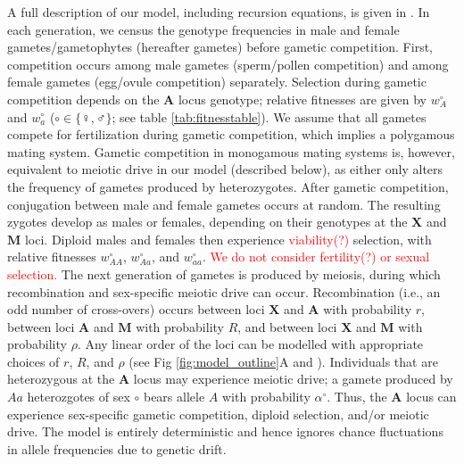 \documentclass[10pt,letterpaper]{article}
\begin{document}
A full description of our model, including recursion equations, is given in . 
In each generation, we census the genotype frequencies in male and female gametes/gametophytes (hereafter gametes) before gametic competition. 
First, competition occurs among male gametes (sperm/pollen competition) and among female gametes (egg/ovule competition) separately. 
Selection during gametic competition depends on the $\mathbf{A}$ locus genotype; relative fitnesses are given by $w_A^\circ$ and $w_a^\circ$ ($\circ \in \{\female,\male\}$; see table \ref{tab:fitnesstable}). %
We assume that all gametes compete for fertilization during gametic competition, which implies a polygamous mating system. 
Gametic competition in monogamous mating systems is, however, equivalent to meiotic drive in our model (described below), as either only alters the frequency of gametes produced by heterozygotes. 
After gametic competition, conjugation between male and female gametes occurs at random.
The resulting zygotes develop as males or females, depending on their genotypes at the $\mathbf{X}$ and $\mathbf{M}$ loci. %
Diploid males and females then experience \textcolor{red}{viability(?)} selection, with relative fitnesses $w_{AA}^{\circ}$, $w_{Aa}^{\circ}$, and $w_{aa}^{\circ}$. %
\textcolor{red}{We do not consider fertility(?) or sexual selection.}
The next generation of gametes is produced by meiosis, during which recombination and sex-specific meiotic drive can occur. 
Recombination (i.e., an odd number of cross-overs) occurs between loci $\mathbf{X}$ and $\mathbf{A}$ with probability $r$, between loci $\mathbf{A}$ and $\mathbf{M}$ with probability $R$, and between loci $\mathbf{X}$ and $\mathbf{M}$ with probability $\rho$.
Any linear order of the loci can be modelled with appropriate choices of $r$, $R$, and $\rho$ (see Fig \ref{fig:model_outline}A and ). 
Individuals that are heterozygous at the $\mathbf{A}$ locus may experience meiotic drive; a gamete produced by $Aa$ heterozgotes of sex $\circ$ bears allele $A$ with probability $\alpha^\circ$. 
Thus, the $\mathbf{A}$ locus can experience sex-specific gametic competition, diploid selection, and/or meiotic drive.
The model is entirely deterministic and hence ignores chance fluctuations in allele frequencies due to genetic drift.
\end{document}
